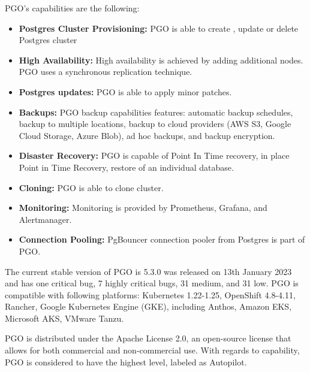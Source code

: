PGO’s capabilities are the following:
\begin{itemize}
  \item \textbf{Postgres Cluster Provisioning:} PGO is able to create \cite{CrunchyDocCreate}, update \cite{CrunchyDocUpdate} or delete Postgres cluster \cite{CrunchyDocDelete}
  \item \textbf{High Availability:} High availability is achieved by adding additional nodes. PGO uses a synchronous replication technique. \cite{CrunchyDocHA}
  \item \textbf{Postgres updates:} PGO is able to apply minor patches. \cite{CrunchyDocMinorUpdates}
  \item \textbf{Backups:} PGO backup capabilities features: automatic backup schedules, backup to multiple locations, backup to cloud providers (AWS S3, Google Cloud Storage, Azure Blob), ad hoc backups, and backup encryption. \cite{CrunchyDocBackups}
  \item \textbf{Disaster Recovery:} PGO is capable of Point In Time recovery, in place Point in Time Recovery, restore of an individual database. \cite{CrunchyDocDisasterRecovery}
  \item \textbf{Cloning:} PGO is able to clone cluster. \cite{CrunchyDocDisasterRecovery}
  \item \textbf{Monitoring:} Monitoring is provided by Prometheus, Grafana, and Alertmanager. \cite{CrunchyDocMonitoring}
  \item \textbf{Connection Pooling:} PgBouncer connection pooler from Postgres is part of PGO. \cite{CrunchyDocConnectionPooling}
\end{itemize}

The current stable version of PGO is 5.3.0 was released on 13th January 2023 and has one critical bug, 7 highly critical bugs, 31 medium, and 31 low. \cite{ArtifactHubCrunchy}
PGO is compatible with following platforms: Kubernetes 1.22-1.25, OpenShift 4.8-4.11, Rancher, Google Kubernetes Engine (GKE), including Anthos, Amazon EKS, Microsoft AKS, VMware Tanzu. \cite{CrunchyDoc}

PGO is distributed under the Apache License 2.0, an open-source license that allows for both commercial and non-commercial use. With regards to capability, PGO is considered to have the highest level, labeled as Autopilot. \cite{OperatorHubCrunchy}

